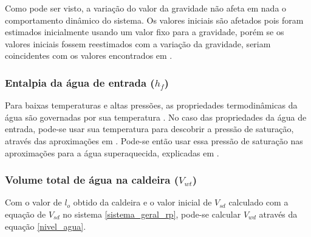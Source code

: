 \begin{figure}[H]
\end{figure}

Como pode ser visto, a variação do valor da gravidade não afeta em
nada o comportamento dinâmico do sistema. Os valores iniciais são
afetados pois foram estimados inicialmente usando um valor fixo para a
gravidade, porém se os valores iniciais fossem reestimados com a
variação da gravidade, seriam coincidentes com os valores encontrados
em .

\subsubsection{Entalpia da água de entrada ($h_f$)}

Para baixas temperaturas e altas pressões, as propriedades
termodinâmicas da água são governadas por sua temperatura
\cite{garland2}. No caso das propriedades da água de entrada, pode-se
usar sua temperatura para descobrir a pressão de saturação, através
das aproximações em . Pode-se então usar essa
pressão de saturação nas aproximações para a água superaquecida,
explicadas em .

\subsubsection{Volume total de água na caldeira ($V_{wt}$)}

Com o valor de $l_o$ obtido da caldeira e o valor inicial de $V_{sd}$
calculado com a equação de $V_{sd}$ no sistema \ref{sistema_geral_rp},
pode-se calcular $V_{wd}$ através da equação \ref{nivel_agua}.

